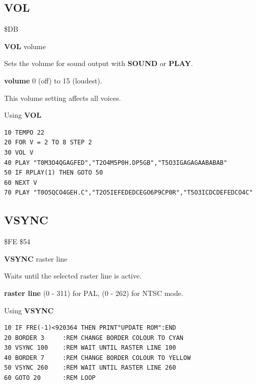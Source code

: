 \subsection{VOL}
\begin{description}[leftmargin=2cm,style=nextline]
\item [Token:] \$DB
\item [Format:] {\bf VOL} volume
\item [Usage:] Sets the volume for sound output with
               {\bf SOUND} or {\bf PLAY}.

               {\bf volume} 0 (off) to 15 (loudest).

\item [Remarks:] This volume setting affects all voices.

\item [Example:] Using {\bf VOL}
\begin{tcolorbox}[colback=black,coltext=white]
\verbatimfont{\codefont}
\begin{verbatim}
10 TEMPO 22
20 FOR V = 2 TO 8 STEP 2
30 VOL V
40 PLAY "T0M3O4QGAGFED","T2O4M5P0H.DP5GB","T5O3IGAGAGAABABAB"
50 IF RPLAY(1) THEN GOTO 50
60 NEXT V
70 PLAY "T0O5QCO4GEH.C","T2O5IEFEDEDCEGO6P9CP0R","T5O3ICDCDEFEDCO4C"
\end{verbatim}
\end{tcolorbox}
\end{description}


\newpage
\subsection{VSYNC}
\begin{description}[leftmargin=2cm,style=nextline]
\item [Token:] \$FE \$54
\item [Format:] {\bf VSYNC} raster line
\item [Usage:] Waits until the selected raster line is active.

               {\bf raster line} (0 - 311) for PAL, (0 - 262) for NTSC mode.

\item [Example:] Using {\bf VSYNC}
\begin{tcolorbox}[colback=black,coltext=white]
\verbatimfont{\codefont}
\begin{verbatim}
10 IF FRE(-1)<920364 THEN PRINT"UPDATE ROM":END
20 BORDER 3     :REM CHANGE BORDER COLOUR TO CYAN
30 VSYNC 100    :REM WAIT UNTIL RASTER LINE 100
40 BORDER 7     :REM CHANGE BORDER COLOUR TO YELLOW
50 VSYNC 260    :REM WAIT UNTIL RASTER LINE 260
60 GOTO 20      :REM LOOP
\end{verbatim}
\end{tcolorbox}
\end{description}

